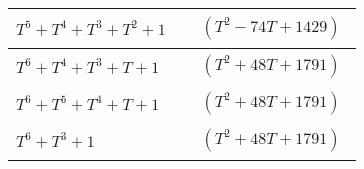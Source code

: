 \begin{tabular}{| l | l |}
\hline
$T^5 + T^4 + T^3 + T^2 + 1$ &
$\!\begin{aligned}
	&(T^{2} - 74T + 1429)\end{aligned}$ \\
\hline
$T^6 + T^4 + T^3 + T + 1$ &
$\!\begin{aligned}
	&(T^{2} + 48T + 1791)\end{aligned}$ \\
\hline
$T^6 + T^5 + T^4 + T + 1$ &
$\!\begin{aligned}
	&(T^{2} + 48T + 1791)\end{aligned}$ \\
\hline
$T^6 + T^3 + 1$ &
$\!\begin{aligned}
	&(T^{2} + 48T + 1791)\end{aligned}$ \\
\hline
\end{tabular}


